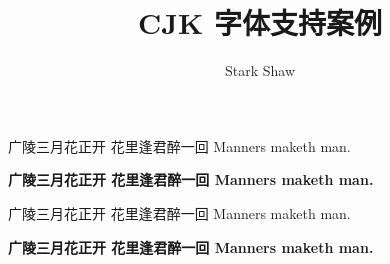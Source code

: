 \documentclass{article}
\begin{document}
\title{\textsf{\textbf{CJK 字体支持案例}}}
\author{Stark Shaw}

\maketitle

\textsf{广陵三月花正开 \space 花里逢君醉一回 \space Manners maketh man.}\par
\textsf{\textbf{广陵三月花正开 \space 花里逢君醉一回 \space Manners maketh man.}}\par

广陵三月花正开 \space 花里逢君醉一回 \space Manners maketh man.\par
\textbf{广陵三月花正开 \space 花里逢君醉一回 \space Manners maketh man.}\par
\end{document}
